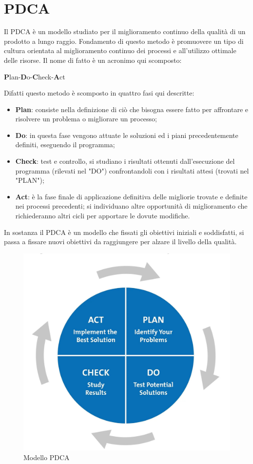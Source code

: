 \section{PDCA}\label{PDCASection}
Il PDCA è un modello studiato per il miglioramento continuo della qualità di un prodotto a lungo raggio. Fondamento di questo metodo è promuovere un tipo di cultura orientata al miglioramento continuo dei processi e all'utilizzo ottimale delle risorse. Il nome di fatto è un acronimo qui scomposto:
\begin{center}
	\item \textbf{P}lan-\textbf{D}o-\textbf{C}heck-\textbf{A}ct
\end{center}
Difatti questo metodo è scomposto in quattro fasi qui descritte:
\begin{itemize}
	\item \textbf{Plan}: consiste nella definizione di ciò che bisogna essere fatto per affrontare e risolvere un problema o migliorare un processo;
	\item \textbf{Do}: in questa fase vengono attuate le soluzioni ed i piani precedentemente definiti, eseguendo il programma;
	\item \textbf{Check}: test e controllo, si studiano i risultati ottenuti dall'esecuzione del programma (rilevati nel "DO") confrontandoli con i risultati attesi (trovati nel "PLAN"); 
	\item \textbf{Act}: è la fase finale di applicazione definitiva delle migliorie trovate e definite nei processi precedenti; si individuano altre opportunità di miglioramento che richiederanno altri cicli per apportare le dovute modifiche.
\end{itemize}
In sostanza il PDCA è un modello che fissati gli obiettivi iniziali e soddisfatti, si passa a fissare nuovi obiettivi da raggiungere per alzare il livello della qualità.

\begin{figure}[H]
\centering
	\includegraphics[width=0.4\linewidth]{./images/pdca.jpg}
	\caption{Modello PDCA}
	\label{pdca}
\end{figure} 

 